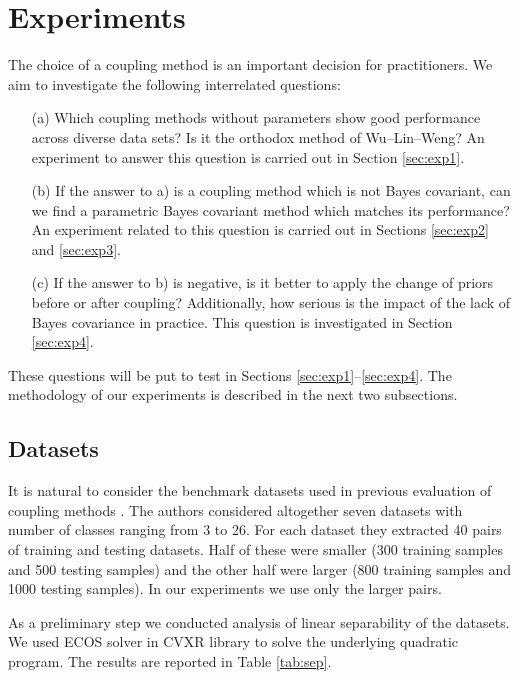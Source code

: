 \section{Experiments}

The choice of a coupling method is an important decision for practitioners. We aim to investigate the following interrelated questions:

\begin{itemize}
	\item[(a)] Which coupling methods without parameters show good performance across diverse data sets? Is it the orthodox method of Wu--Lin--Weng? An experiment to answer this question is carried out in Section \ref{sec:exp1}. 
	\item[(b)] If the answer to a) is a coupling method which is not Bayes covariant, can we find a parametric Bayes covariant method which  matches its performance? An experiment related to this question is carried out in  Sections \ref{sec:exp2} and \ref{sec:exp3}.
	\item[(c)] If the answer to b) is negative, is it better to apply the change of priors before or after coupling? Additionally, how serious is the impact of the lack of Bayes covariance in practice. This question is investigated in Section \ref{sec:exp4}.
\end{itemize}

These questions will be put to test in Sections \ref{sec:exp1}--\ref{sec:exp4}. The methodology of our experiments is described in the next two subsections.

\subsection{Datasets}

It is natural to consider the benchmark datasets used in previous evaluation of coupling methods \cite{wu2004probability}. The authors considered altogether seven datasets with number of classes ranging from 3 to 26. For each dataset they extracted 40 pairs of training and testing datasets. Half of these were smaller (300 training samples and 500 testing samples) and the other half were larger (800 training samples and 1000 testing samples). In our experiments we use only the larger pairs. 

As a preliminary step we conducted analysis of linear separability of the datasets. We used ECOS solver in CVXR library to solve the underlying quadratic program. The results are reported in Table \ref{tab:sep}.

